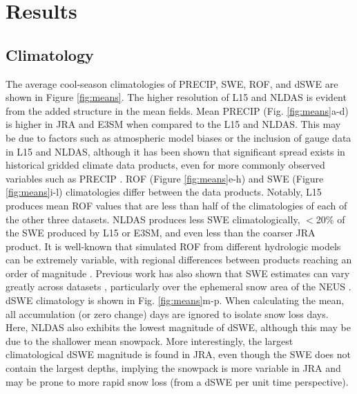 \documentclass[nhess, manuscript]{copernicus}
\begin{document}

\section{Results}

\subsection{Climatology}

The average cool-season climatologies of PRECIP, SWE, ROF, and dSWE are shown in Figure \ref{fig:means}.
The higher resolution of L15 and NLDAS is evident from the added structure in the mean fields.
Mean PRECIP (Fig. \ref{fig:means}a-d) is higher in JRA and E3SM when compared to the L15 and NLDAS.
This may be due to factors such as atmospheric model biases or the inclusion of gauge data in L15 and NLDAS, although it has been shown that significant spread exists in historical gridded climate data products, even for more commonly observed variables such as PRECIP \citep{gutmann2012comparison,livneh2014filling,henn2018an}.
ROF (Figure \ref{fig:means}e-h) and SWE (Figure \ref{fig:means}i-l) climatologies differ between the data products.
Notably, L15 produces mean ROF values that are less than half of the climatologies of each of the other three datasets.
NLDAS produces less SWE climatologically, $<$20\% of the SWE produced by L15 or E3SM, and even less than the coarser JRA product.
It is well-known that simulated ROF from different hydrologic models can be extremely variable, with regional differences between products reaching an order of magnitude \citep{gudmundsson2012comparing,sood2015global,beck2017global}.
Previous work has also shown that SWE estimates can vary greatly across datasets \citep{lundquist2015high,Rhoades2018a}, particularly over the ephemeral snow area of the NEUS \citep{mccrary2017evaluation,mccrary2022projections}.
dSWE climatology is shown in Fig. \ref{fig:means}m-p.
When calculating the mean, all accumulation (or zero change) days are ignored to isolate snow loss days.
Here, NLDAS also exhibits the lowest magnitude of dSWE, although this may be due to the shallower mean snowpack.
More interestingly, the largest climatological dSWE magnitude is found in JRA, even though the SWE does not contain the largest depths, implying the snowpack is more variable in JRA and may be prone to more rapid snow loss (from a dSWE per unit time perspective).
\end{document}
